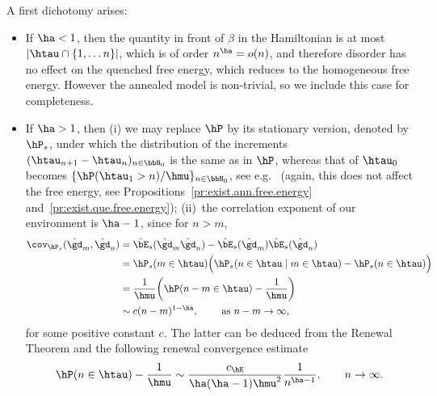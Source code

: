 A first dichotomy arises:
\begin{itemize}
\item If $\ha < 1$, then the quantity in front of $\beta$ in the Hamiltonian is at most $|\htau \cap \{1,\ldots n\}|$, which is of order $n^{\ha}= o(n)$, and therefore disorder has no effect on the quenched free energy, which reduces to the homogeneous free energy. However the annealed model is non-trivial, so we include this case for completeness.

\item If $\ha > 1$, then (i) we may replace $\hP$ by its stationary version, denoted by $\hP_s$, under which the distribution of the increments $(\htau_{n + 1} - \htau_n)_{n \in \bbN_0}$ is the same as in $\hP$, whereas that of $\htau_0$ becomes $\{ \hP(\htau_1 > n) / \hmu\}_{n \in \bbN_0}$, see e.g.~\cite[Chapter~V, Corollary~3.6]{A2003} (again, this does not affect the free energy, see Propositions~\ref{pr:exist.ann.free.energy} and~\ref{pr:exist.que.free.energy}); (ii)~the correlation exponent of our environment is $\ha - 1$, since for $n > m$,
\begin{equation}\label{eq:speed_corr}
\begin{aligned}
\cov_{\hP_s}(\hat \gd_m, \hat \gd_n) &= \hat \bE_s(\hat \gd_m \hat \gd_n) - \hat \bE_s(\hat \gd_m) \hat \bE_s(\hat \gd_n)\\
&= \hP_s(m \in \htau) \Big(\hP_s(n \in \htau \mid m \in \htau) - \hP_s(n \in \htau) \Big)\\
&= \frac{1}{\hmu} \bigg(\hP(n - m \in \htau) - \frac{1}{\hmu} \bigg)\\
&\sim c (n - m)^{1 - \ha}, \qquad \text{ as } n - m \to \infty,
\end{aligned}
\end{equation}
for some positive constant $c$. The latter can be deduced from the Renewal Theorem and the following renewal convergence estimate~\cite[Lemma~4]{Fr82}
\begin{equation}\label{eq:ren.conv.est}
\hP(n \in \htau) - \frac{1}{\hmu} \sim \frac{c_{\hK}}{\ha (\ha - 1) \hmu^2} \frac{1}{n^{\ha - 1}}, \qquad n \to \infty.
\end{equation}
\end{itemize}

